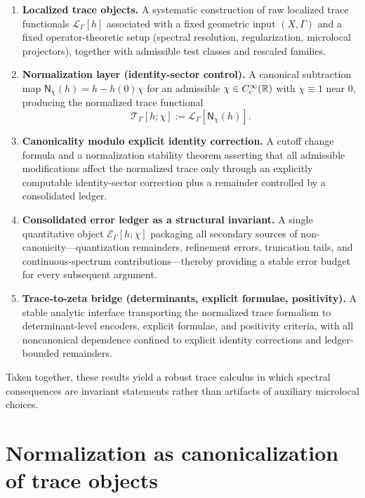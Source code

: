 \begin{enumerate}
\item \textbf{Localized trace objects.}
A systematic construction of raw localized trace functionals $\mathcal L_\Gamma[h]$ associated with a fixed geometric input
$(X,\Gamma)$ and a fixed operator-theoretic setup (spectral resolution, regularization, microlocal projectors), together with
admissible test classes and rescaled families.

\item \textbf{Normalization layer (identity-sector control).}
A canonical subtraction map $\mathsf N_\chi(h)=h-h(0)\chi$ for an admissible $\chi\in C_c^\infty(\mathbb{R})$ with $\chi\equiv1$ near $0$,
producing the normalized trace functional
\[
\mathcal T_\Gamma[h;\chi]:=\mathcal L_\Gamma[\mathsf N_\chi(h)].
\]

\item \textbf{Canonicality modulo explicit identity correction.}
A cutoff change formula and a normalization stability theorem asserting that all admissible modifications affect the normalized
trace only through an explicitly computable identity-sector correction plus a remainder controlled by a consolidated ledger.

\item \textbf{Consolidated error ledger as a structural invariant.}
A single quantitative object $\mathcal E_\Gamma[h;\chi]$ packaging all secondary sources of non-canonicity---quantization
remainders, refinement errors, truncation tails, and continuous-spectrum contributions---thereby providing a stable error budget
for every subsequent argument.

\item \textbf{Trace-to-zeta bridge (determinants, explicit formulae, positivity).}
A stable analytic interface transporting the normalized trace formalism to determinant-level encoders, explicit formulae, and
positivity criteria, with all noncanonical dependence confined to explicit identity corrections and ledger-bounded remainders.
\end{enumerate}

Taken together, these results yield a robust trace calculus in which spectral consequences are invariant statements
rather than artifacts of auxiliary microlocal choices.

\section{Normalization as canonicalization of trace objects}
\label{sec:11.normalization}

